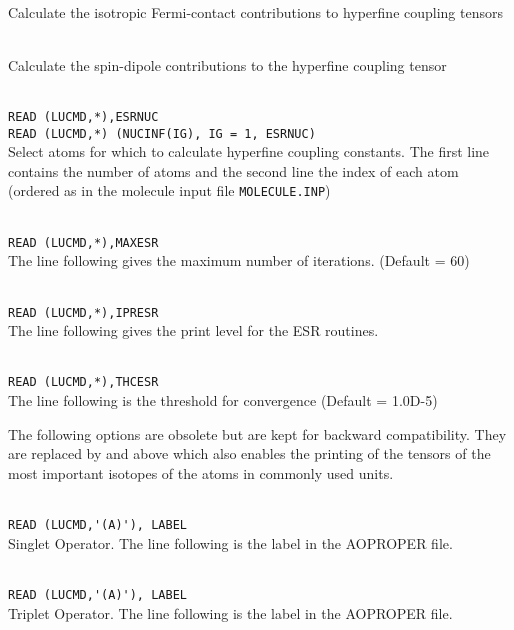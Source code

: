 \begin{description}
\item{} \\
Calculate the isotropic Fermi-contact contributions to hyperfine coupling tensors
\item{} \\
Calculate the spin-dipole contributions to the hyperfine coupling tensor
\item{} \\
\verb|READ (LUCMD,*),ESRNUC |\\
\verb|READ (LUCMD,*) (NUCINF(IG), IG = 1, ESRNUC) | \\
Select atoms for which to calculate hyperfine coupling constants.
The first line contains  the number of atoms and the second line the
index of each atom (ordered as in the molecule input file \texttt{MOLECULE.INP})
\item{}      \\
\verb|READ (LUCMD,*),MAXESR |\\
   The line following gives the maximum number of iterations.  (Default = 60)

\item{}     \\
\verb|READ (LUCMD,*),IPRESR |\\
   The line following gives the print level for the ESR routines.

\item{}     \\
\verb|READ (LUCMD,*),THCESR|\\
   The line following is the threshold for convergence (Default = 1.0D-5)

\end{description}
The following options are obsolete but are kept for backward compatibility.
They are replaced by  and  above which also
enables the printing of the tensors of the most important isotopes of the
atoms in commonly used units.
\begin{description}

\item{}    \\
\verb|READ (LUCMD,'(A)'), LABEL|\\
   Singlet Operator. The line following is the label in the AOPROPER file.

\item{}    \\
\verb|READ (LUCMD,'(A)'), LABEL |\\
   Triplet Operator. The line following is the label in the AOPROPER file.


\end{description}

